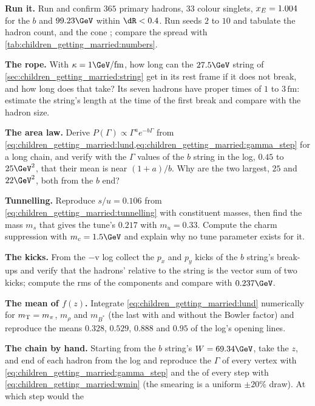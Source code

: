 \begin{exercises}
\item \textbf{Run it.} Run  and confirm
  $365$ primary hadrons, $33$ colour singlets, $x_E=1.004$ for the $b$ and
  $99.23\GeV$ within $\dR<0.4$. Run seeds $2$ to $10$ and tabulate the
  hadron count, \xE and the cone \pt; compare the spread with
  \cref{tab:children_getting_married:numbers}.
\item \textbf{The rope.} With $\kappa=1\GeV/\mathrm{fm}$, how long can the
  $27.5\GeV$ string of \cref{sec:children_getting_married:string} get in
  its rest frame if it does not break, and how long does that take? Its
  seven hadrons have proper times of $1$ to $3\,\mathrm{fm}$: estimate the
  string's length at the time of the first break and compare with the
  hadron size.
\item \textbf{The area law.} Derive $P(\Gamma)\propto\Gamma^ae^{-b\Gamma}$
  from \cref{eq:children_getting_married:lund,eq:children_getting_married:gamma_step}
  for a long chain, and verify with the $\Gamma$ values of the $b$ string
  in the log, $0.45$ to $25\GeV^2$, that their mean is near $(1+a)/b$. Why
  are the two largest, $25$ and $22\GeV^2$, both from the $b$ end?
\item \textbf{Tunnelling.} Reproduce $s/u=0.106$ from
  \cref{eq:children_getting_married:tunnelling} with constituent masses,
  then find the mass $m_s$ that gives the tune's $0.217$ with $m_u=0.33$.
  Compute the charm suppression with $m_c=1.5\GeV$ and explain why no
  tune parameter exists for it.
\item \textbf{The kicks.} From the $-$v log collect the $p_x$ and $p_y$
  kicks of the $b$ string's break-ups and verify that the hadrons' \pt
  relative to the string is the vector sum of two kicks; compute the rms of
  the components and compare with $0.237\GeV$.
\item \textbf{The mean of $f(z)$.} Integrate
  \cref{eq:children_getting_married:lund} numerically for $m_{\mathrm{T}}=m_\pi$,
  $m_\rho$ and $m_{B^*}$ (the last with and without the Bowler factor) and
  reproduce the means $0.328$, $0.529$, $0.888$ and $0.95$ of the log's
  opening lines.
\item \textbf{The chain by hand.} Starting from the $b$ string's $W=69.34\GeV$,
  take the $z$, \mT and end of each hadron from the log and reproduce the
  $\Gamma$ of every vertex with \cref{eq:children_getting_married:gamma_step}
  and the \Wmin of every step with \cref{eq:children_getting_married:wmin}
  (the smearing is a uniform $\pm20\%$ draw). At which step would the

\end{exercises}
